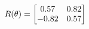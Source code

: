 \documentclass[preview]{standalone}
\begin{document}
\begin{align*}
\special{dvisvgm:raw <g id='unique000'>}R(\theta) = \begin{bmatrix}0.57 & 0.82\\-0.82 & 0.57\end{bmatrix}\special{dvisvgm:raw </g>}
\end{align*}
\end{document}
